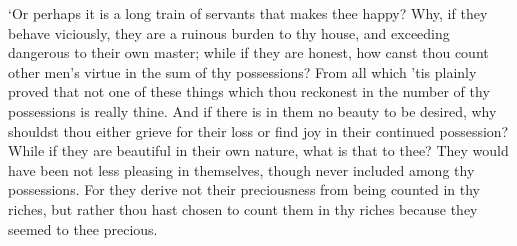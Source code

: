 \documentclass[12pt]{book}
\begin{document}
`Or perhaps it is a long train of servants that makes thee happy? Why,
if they behave viciously, they are a ruinous burden to thy house, and
exceeding dangerous to their own master; while if they are honest, how
canst thou count other men's virtue in the sum of thy possessions? From
all which 'tis plainly proved that not one of these things which thou
reckonest in the number of thy possessions is really thine. And if there
is in them no beauty to be desired, why shouldst thou either grieve for
their loss or find joy in their continued possession? While if they are
beautiful in their own nature, what is that to thee? They would have
been not less pleasing in themselves, though never included among thy
possessions. For they derive not their preciousness from being counted
in thy riches, but rather thou hast chosen to count them in thy riches
because they seemed to thee precious.
\end{document}
